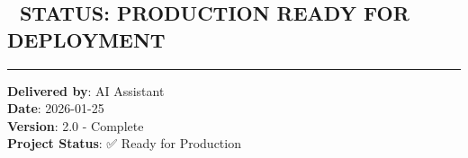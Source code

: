 \documentclass[
  11pt,
  oneside,
  openany]{scrbook}
\begin{document}
\subsection{\texorpdfstring{🚀 \textbf{STATUS: PRODUCTION READY FOR
DEPLOYMENT}}{🚀 STATUS: PRODUCTION READY FOR DEPLOYMENT}}\label{status-production-ready-for-deployment}

\begin{center}\rule{0.5\linewidth}{0.5pt}\end{center}

\textbf{Delivered by}: AI Assistant\\
\textbf{Date}: 2026-01-25\\
\textbf{Version}: 2.0 - Complete\\
\textbf{Project Status}: ✅ Ready for Production


\backmatter
\end{document}
